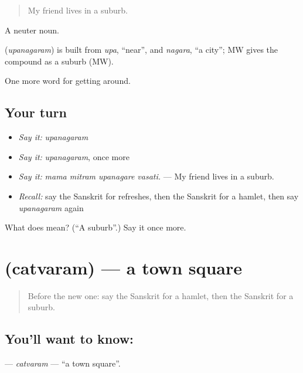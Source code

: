 \begin{quote}
My friend lives in a suburb.
\end{quote}

A neuter noun.

\begin{cousinweb}
\textbf{} (\emph{upanagaram}) is built from \emph{upa}, \textquotedblleft{}near\textquotedblright{}, and \emph{nagara}, \textquotedblleft{}a city\textquotedblright{}; MW gives the compound as a suburb (MW).
\end{cousinweb}

\begin{grammarlens}[title={What you've built}]
One more word for getting around.
\end{grammarlens}

\subsection*{Your turn}
\begin{itemize}
\raggedright
  \item \emph{Say it:} \emph{upanagaram}
  \item \emph{Say it:} \emph{upanagaram}, once more
  \item \emph{Say it:} \emph{mama mitram upanagare vasati.} — My friend lives in a suburb.
  \item \emph{Recall:} say the Sanskrit for refreshes, then the Sanskrit for a hamlet, then say \emph{upanagaram} again
\end{itemize}

\begin{tcolorbox}[breakable,colback=teal!4,colframe=teal!35!black,title={Before you move on}]
What does  mean? (\textquotedblleft{}A suburb\textquotedblright{}.) Say it once more.
\end{tcolorbox}
\section[\texorpdfstring{\sk{चत्वरम्} (catvaram)}{चत्वरम् (catvaram)}]{ (catvaram) — a town square}

\label{lesson:SA-C421-catvaram}



\begin{quote}
Before the new one: say the Sanskrit for a hamlet, then the Sanskrit for a suburb.
\end{quote}

\subsection*{You'll want to know: }
\textbf{} — \emph{catvaram} — \textquotedblleft{}a town square\textquotedblright{}.

